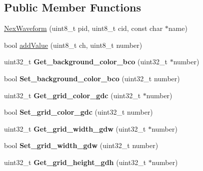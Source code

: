 \subsection*{Public Member Functions}
\begin{DoxyCompactItemize}
\item 
\hyperlink{class_nex_waveform_a4f18ca5050823e874d526141c8595514}{Nex\+Waveform} (uint8\+\_\+t pid, uint8\+\_\+t cid, const char $\ast$name)
\item 
bool \hyperlink{class_nex_waveform_a5b04ea7397b784947b845e2a03fc77e4}{add\+Value} (uint8\+\_\+t ch, uint8\+\_\+t number)
\item 
\hypertarget{class_nex_waveform_a66cec3c4d0d1a769dbf50c8092cc01d1}{uint32\+\_\+t {\bfseries Get\+\_\+background\+\_\+color\+\_\+bco} (uint32\+\_\+t $\ast$number)}\label{class_nex_waveform_a66cec3c4d0d1a769dbf50c8092cc01d1}

\item 
\hypertarget{class_nex_waveform_aefec5eb25ee698c8c940c9190d60b696}{bool {\bfseries Set\+\_\+background\+\_\+color\+\_\+bco} (uint32\+\_\+t number)}\label{class_nex_waveform_aefec5eb25ee698c8c940c9190d60b696}

\item 
\hypertarget{class_nex_waveform_ac5a6622e9004600f24b12e60ebb6b984}{uint32\+\_\+t {\bfseries Get\+\_\+grid\+\_\+color\+\_\+gdc} (uint32\+\_\+t $\ast$number)}\label{class_nex_waveform_ac5a6622e9004600f24b12e60ebb6b984}

\item 
\hypertarget{class_nex_waveform_ab396211f736824a0210446e68dc3edf4}{bool {\bfseries Set\+\_\+grid\+\_\+color\+\_\+gdc} (uint32\+\_\+t number)}\label{class_nex_waveform_ab396211f736824a0210446e68dc3edf4}

\item 
\hypertarget{class_nex_waveform_ad5c4968c81d4941a08841cbaf217c631}{uint32\+\_\+t {\bfseries Get\+\_\+grid\+\_\+width\+\_\+gdw} (uint32\+\_\+t $\ast$number)}\label{class_nex_waveform_ad5c4968c81d4941a08841cbaf217c631}

\item 
\hypertarget{class_nex_waveform_a41cb6d8b1ff6c309d1c4e8a1f73304fe}{bool {\bfseries Set\+\_\+grid\+\_\+width\+\_\+gdw} (uint32\+\_\+t number)}\label{class_nex_waveform_a41cb6d8b1ff6c309d1c4e8a1f73304fe}

\item 
\hypertarget{class_nex_waveform_a87f6baf5a7a9c52f54281865e757d9a3}{uint32\+\_\+t {\bfseries Get\+\_\+grid\+\_\+height\+\_\+gdh} (uint32\+\_\+t $\ast$number)}\label{class_nex_waveform_a87f6baf5a7a9c52f54281865e757d9a3}


\end{DoxyCompactItemize}
